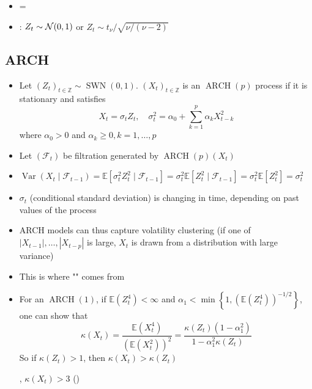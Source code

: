 \begin{itemize}[leftmargin=*]
    \item {} = 

    \item {}: $Z_{t} \sim \operatorname{\mathcal{N}}(0,1)$ or $Z_{t} \sim t_{\nu} / \sqrt{\nu /(\nu-2)}$
\end{itemize}





\subsection*{ARCH}
\begin{itemize}[leftmargin=*]
    \item Let $\left(Z_{t}\right)_{t \in \mathbb{Z}} \sim \operatorname{SWN}(0,1)$. $\left(X_{t}\right)_{t \in \mathbb{Z}}$ is an $\operatorname{ARCH}(p)$ process if it is stationary and satisfies
$$
X_{t} =\sigma_{t} Z_{t},\quad \sigma_{t}^{2} =\alpha_{0}+\sum_{k=1}^{p} \alpha_{k} X_{t-k}^{2}
$$
where $\alpha_{0}>0$ and $\alpha_{k} \geq 0, k=1, \ldots, p$
    \item Let $\left(\mathcal{F}_{t}\right)$ be filtration generated by $\operatorname{ARCH}(p)\left(X_{t}\right)$
    \item $
\operatorname{Var}\left(X_{t} \mid \mathcal{F}_{t-1}\right)=\mathbb{E}\left[\sigma_{t}^{2} Z_{t}^{2} \mid \mathcal{F}_{t-1}\right]=\sigma_{t}^{2} \mathbb{E}\left[Z_{t}^{2} \mid \mathcal{F}_{t-1}\right]=\sigma_{t}^{2} \mathbb{E}\left[Z_{t}^{2}\right]=\sigma_{t}^{2}
$
    \item {} $\sigma_{t}$ (conditional standard deviation) is changing in time, depending on past values of the process
    \item ARCH models can thus capture volatility clustering (if one of $\left|X_{t-1}\right|, \ldots,\left|X_{t-p}\right|$ is large, $X_{t}$ is drawn from a distribution with large variance)
    \item This is where "" comes from
    \item For an $\operatorname{ARCH}(1)$, if $\mathbb{E}\left(Z_{t}^{4}\right)<\infty$ and $\alpha_{1}<\min \left\{1,\left(\mathbb{E}\left(Z_{t}^{4}\right)\right)^{-1 / 2}\right\}$, one can show that
$$
\kappa\left(X_{t}\right)=\frac{\mathbb{E}\left(X_{t}^{4}\right)}{\left(\mathbb{E}\left(X_{t}^{2}\right)\right)^{2}}=\frac{\kappa\left(Z_{t}\right)\left(1-\alpha_{1}^{2}\right)}{1-\alpha_{1}^{2} \kappa\left(Z_{t}\right)}
$$
So if $\kappa\left(Z_{t}\right)>1$, then $\kappa\left(X_{t}\right)>\kappa\left(Z_{t}\right)$

, $\kappa\left(X_{t}\right)>3$ ()
\end{itemize}



